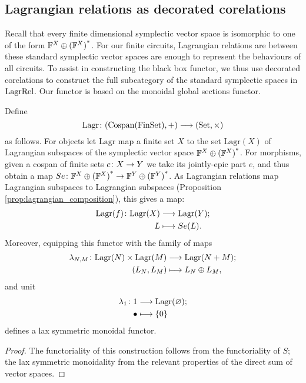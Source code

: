 \subsection{Lagrangian relations as decorated corelations}
Recall that every finite dimensional symplectic vector space is isomorphic to
one of the form ${{\mathbb F}^{X} \oplus {({\mathbb F}^{X})}^\ast}$. For our finite circuits, Lagrangian relations are
between these standard symplectic vector spaces are enough to represent the
behaviours of all circuits. To assist in constructing the black box functor, we
thus use decorated corelations to construct the full subcategory of the standard
symplectic spaces in $\mathrm{LagrRel}$. Our functor is based on the monoidal global
sections functor.

\begin{proposition}
Define 
\[
  \mathrm{Lagr}{\colon} (\operatorname{{Cospan}}(\mathrm{FinSet}),+) \longrightarrow (\mathrm{Set},\times)
\]
as follows. For objects let $\mathrm{Lagr}$ map a finite set $X$ to the set
$\mathrm{Lagr}(X)$ of Lagrangian subspaces of the symplectic vector space
${{\mathbb F}^{X} \oplus {({\mathbb F}^{X})}^\ast}$.  For morphisms, given a cospan of finite sets $c{\colon} X \to Y$ we
take its jointly-epic part $e$, and thus obtain a map $Se{\colon} {{\mathbb F}^{X} \oplus {({\mathbb F}^{X})}^\ast} \to
{{\mathbb F}^{Y} \oplus {({\mathbb F}^{Y})}^\ast}$. As Lagrangian relations map Lagrangian subspaces to Lagrangian
subspaces (Proposition \ref{prop:lagrangian_composition}), this gives a map: 
\begin{align*}
  \mathrm{Lagr}(f){\colon} \mathrm{Lagr}(X) &\longrightarrow \mathrm{Lagr}(Y); \\
  L &\longmapsto Se(L).
\end{align*}
Moreover, equipping this functor with the family of maps
\begin{align*}
  \lambda_{N,M}{\colon} \mathrm{Lagr}(N) \times \mathrm{Lagr}(M) &\longrightarrow
  \mathrm{Lagr}(N+M);\\
  (L_N,L_M) &\longmapsto L_N \oplus L_M,
\end{align*}
and unit
\begin{align*}
  \lambda_1{\colon} 1 &\longrightarrow \mathrm{Lagr}(\varnothing);\\
  \bullet &\longmapsto \{0\}
\end{align*}
defines a lax symmetric monoidal functor.
\end{proposition}
\begin{proof}
  The functoriality of this construction follows from the functoriality of $S$;
  the lax symmetric monoidality from the relevant properties of the direct sum
  of vector spaces.
\end{proof}

